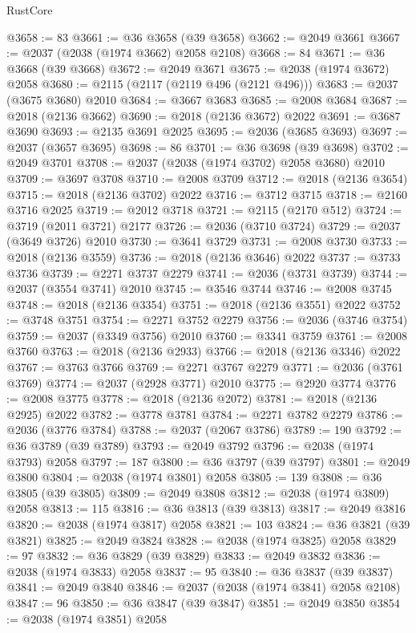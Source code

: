 \begin{lexlean}{RustCore}
\begin{coremodule}
@3658 := 83
@3661 := @36 @3658 (@39 @3658)
@3662 := @2049 @3661
@3667 := @2037 (@2038 (@1974 @3662) @2058 @2108)
@3668 := 84
@3671 := @36 @3668 (@39 @3668)
@3672 := @2049 @3671
@3675 := @2038 (@1974 @3672) @2058
@3680 := @2115 (@2117 (@2119 @496 (@2121 @496)))
@3683 := @2037 (@3675 @3680) @2010
@3684 := @3667 @3683
@3685 := @2008 @3684
@3687 := @2018 (@2136 @3662)
@3690 := @2018 (@2136 @3672) @2022
@3691 := @3687 @3690
@3693 := @2135 @3691 @2025
@3695 := @2036 (@3685 @3693)
@3697 := @2037 (@3657 @3695)
@3698 := 86
@3701 := @36 @3698 (@39 @3698)
@3702 := @2049 @3701
@3708 := @2037 (@2038 (@1974 @3702) @2058 @3680) @2010
@3709 := @3697 @3708
@3710 := @2008 @3709
@3712 := @2018 (@2136 @3654)
@3715 := @2018 (@2136 @3702) @2022
@3716 := @3712 @3715
@3718 := @2160 @3716 @2025
@3719 := @2012 @3718
@3721 := @2115 (@2170 @512)
@3724 := @3719 (@2011 @3721) @2177
@3726 := @2036 (@3710 @3724)
@3729 := @2037 (@3649 @3726) @2010
@3730 := @3641 @3729
@3731 := @2008 @3730
@3733 := @2018 (@2136 @3559)
@3736 := @2018 (@2136 @3646) @2022
@3737 := @3733 @3736
@3739 := @2271 @3737 @2279
@3741 := @2036 (@3731 @3739)
@3744 := @2037 (@3554 @3741) @2010
@3745 := @3546 @3744
@3746 := @2008 @3745
@3748 := @2018 (@2136 @3354)
@3751 := @2018 (@2136 @3551) @2022
@3752 := @3748 @3751
@3754 := @2271 @3752 @2279
@3756 := @2036 (@3746 @3754)
@3759 := @2037 (@3349 @3756) @2010
@3760 := @3341 @3759
@3761 := @2008 @3760
@3763 := @2018 (@2136 @2933)
@3766 := @2018 (@2136 @3346) @2022
@3767 := @3763 @3766
@3769 := @2271 @3767 @2279
@3771 := @2036 (@3761 @3769)
@3774 := @2037 (@2928 @3771) @2010
@3775 := @2920 @3774
@3776 := @2008 @3775
@3778 := @2018 (@2136 @2072)
@3781 := @2018 (@2136 @2925) @2022
@3782 := @3778 @3781
@3784 := @2271 @3782 @2279
@3786 := @2036 (@3776 @3784)
@3788 := @2037 (@2067 @3786)
@3789 := 190
@3792 := @36 @3789 (@39 @3789)
@3793 := @2049 @3792
@3796 := @2038 (@1974 @3793) @2058
@3797 := 187
@3800 := @36 @3797 (@39 @3797)
@3801 := @2049 @3800
@3804 := @2038 (@1974 @3801) @2058
@3805 := 139
@3808 := @36 @3805 (@39 @3805)
@3809 := @2049 @3808
@3812 := @2038 (@1974 @3809) @2058
@3813 := 115
@3816 := @36 @3813 (@39 @3813)
@3817 := @2049 @3816
@3820 := @2038 (@1974 @3817) @2058
@3821 := 103
@3824 := @36 @3821 (@39 @3821)
@3825 := @2049 @3824
@3828 := @2038 (@1974 @3825) @2058
@3829 := 97
@3832 := @36 @3829 (@39 @3829)
@3833 := @2049 @3832
@3836 := @2038 (@1974 @3833) @2058
@3837 := 95
@3840 := @36 @3837 (@39 @3837)
@3841 := @2049 @3840
@3846 := @2037 (@2038 (@1974 @3841) @2058 @2108)
@3847 := 96
@3850 := @36 @3847 (@39 @3847)
@3851 := @2049 @3850
@3854 := @2038 (@1974 @3851) @2058

\end{coremodule}
\end{lexlean}
